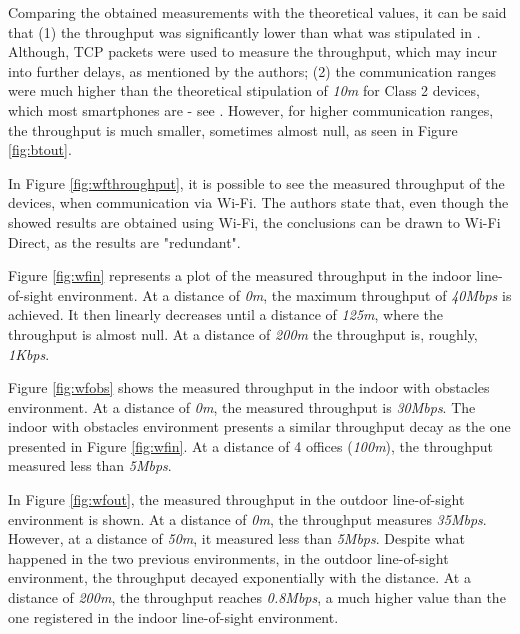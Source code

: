 Comparing the obtained measurements with the theoretical values, it can be said that (1) the throughput was significantly lower than what was stipulated in \cite{bluetoothspec}. Although, \gls{TCP} packets were used to measure the throughput, which may incur into further delays, as mentioned by the authors; (2) the communication ranges were much higher than the theoretical stipulation of \textit{10m} for Class 2 devices, which most smartphones are - see \cite{bluetoothspec}. However, for higher communication ranges, the throughput is much smaller, sometimes almost null, as seen in Figure \ref{fig:btout}.

In Figure \ref{fig:wfthroughput}, it is possible to see the measured throughput of the devices, when communication via Wi-Fi. The authors state that, even though the showed results are obtained using Wi-Fi, the conclusions can be drawn to Wi-Fi Direct, as the results are "redundant".

Figure \ref{fig:wfin} represents a plot of the measured throughput in the indoor line-of-sight environment. At a distance of \textit{0m}, the maximum throughput of \textit{40Mbps} is achieved. It then linearly decreases until a distance of \textit{125m}, where the throughput is almost null. At a distance of \textit{200m} the throughput is, roughly, \textit{1Kbps}.

Figure \ref{fig:wfobs} shows the measured throughput in the indoor with obstacles environment. At a distance of \textit{0m}, the measured throughput is \textit{30Mbps}. The indoor with obstacles environment presents a similar throughput decay as the one presented in Figure \ref{fig:wfin}. At a distance of 4 offices (\textit{100m}), the throughput measured less than \textit{5Mbps}.

In Figure \ref{fig:wfout}, the measured throughput in the outdoor line-of-sight environment is shown. At a distance of \textit{0m}, the throughput measures \textit{35Mbps}. However, at a distance of \textit{50m}, it measured less than \textit{5Mbps}. Despite what happened in the two previous environments, in the outdoor line-of-sight environment, the throughput decayed exponentially with the distance. At a distance of \textit{200m}, the throughput reaches \textit{0.8Mbps}, a much higher value than the one registered in the indoor line-of-sight environment.

